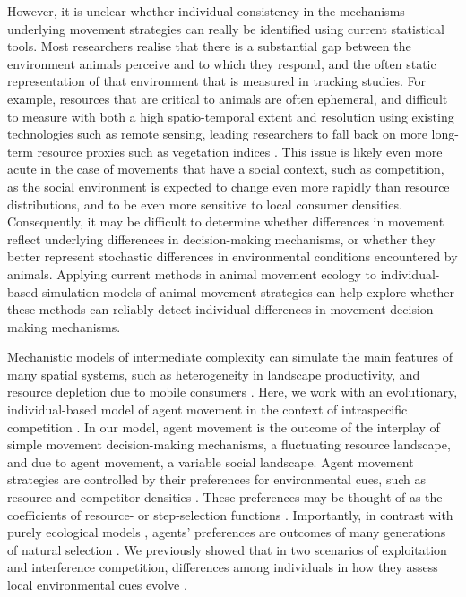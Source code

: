     However, it is unclear whether individual consistency in the mechanisms underlying movement strategies can really be identified using current statistical tools.
    Most researchers realise that there is a substantial gap between the environment animals perceive and to which they respond, and the often static representation of that environment that is measured in tracking studies.
    For example, resources that are critical to animals are often ephemeral, and difficult to measure with both a high spatio-temporal extent and resolution using existing technologies such as remote sensing, leading researchers to fall back on more long-term resource proxies such as vegetation indices \citep{pettorelli2011}.
    This issue is likely even more acute in the case of movements that have a social context, such as competition, as the social environment is expected to change even more rapidly than resource distributions, and to be even more sensitive to local consumer densities.
    Consequently, it may be difficult to determine whether differences in movement reflect underlying differences in decision-making mechanisms, or whether they better represent stochastic differences in environmental conditions encountered by animals.
    Applying current methods in animal movement ecology to individual-based simulation models of animal movement strategies \citep[see e.g.][]{getz2015,getz2016,netz2020,gupte2021a}can help explore whether these methods can reliably detect individual differences in movement decision-making mechanisms.
    
    Mechanistic models of intermediate complexity can simulate the main features of many spatial systems, such as heterogeneity in landscape productivity, and resource depletion due to mobile consumers \citep{getz2015,white2018,deangelis2019,netz2020,gupte2021a,diaz2021}.
    Here, we work with an evolutionary, individual-based model of agent movement in the context of intraspecific competition \citep[both exploitation and interference]{gupte2021a}.
    In our model, agent movement is the outcome of the interplay of simple movement decision-making mechanisms, a fluctuating resource landscape, and due to agent movement, a variable social landscape.
    Agent movement strategies are controlled by their preferences for environmental cues, such as resource and competitor densities \citep[see e.g.][]{getz2015,white2018,netz2020, gupte2021a}.
    These preferences may be thought of as the coefficients of resource- or step-selection functions \citep[][]{white2018,gupte2021a}.
    Importantly, in contrast with purely ecological models \citep[e.g.][]{white2018}, agents' preferences are outcomes of many generations of natural selection \citep[see also][]{getz2015,netz2020}.
    We previously showed that in two scenarios of exploitation and interference competition, differences among individuals in how they assess local environmental cues evolve \citep[][]{gupte2021a}.
    
